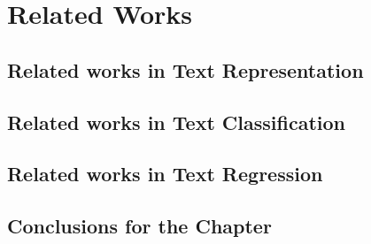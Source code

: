 \chapter{Related Works}\label{cap:related_works}


\section{Related works in Text Representation}


\section{Related works in Text Classification}


\section{Related works in Text Regression}


\section{Conclusions for the Chapter}

